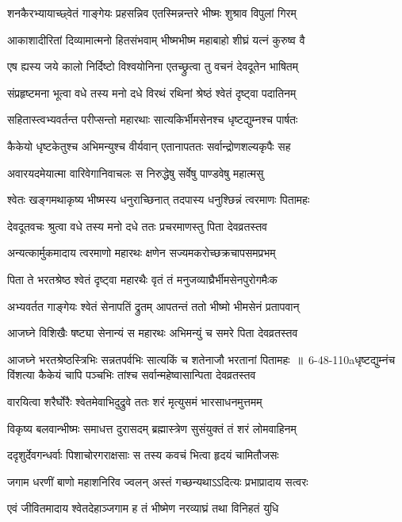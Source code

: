 \twolineshloka
{शनकैरभ्यायाच्छ्वेतं गाङ्गेयः प्रहसन्निव}
{एतस्मिन्नन्तरे भीष्मः शुश्राव विपुलां गिरम्}


\twolineshloka
{आकाशादीरितां दिव्यामात्मनो हितसंभवाम्}
{भीष्मभीष्म महाबाहो शीघ्रं यत्नं कुरुष्व वै}


\twolineshloka
{एष ह्यस्य जये कालो निर्दिष्टो विश्वयोनिना}
{एतच्छ्रुत्वा तु वचनं देवदूतेन भाषितम्}


\twolineshloka
{संप्रहृष्टमना भूत्वा वधे तस्य मनो दधे}
{विरथं रथिनां श्रेष्ठं श्वेतं दृष्ट्वा पदातिनम्}


\twolineshloka
{सहितास्त्वभ्यवर्तन्त परीप्सन्तो महारथाः}
{सात्यकिर्भीमसेनश्च धृष्टद्युम्नश्च पार्षतः}


\twolineshloka
{कैकेयो धृष्टकेतुश्च अभिमन्युश्च वीर्यवान्}
{एतानापततः सर्वान्द्रोणशल्यकृपैः सह}


\twolineshloka
{अवारयदमेयात्मा वारिवेगानिवाचलः}
{स निरुद्धेषु सर्वेषु पाण्डवेषु महात्मसु}


\twolineshloka
{श्वेतः खङ्गमथाकृष्य भीष्मस्य धनुराच्छिनात्}
{तदपास्य धनुश्छिन्नं त्वरमाणः पितामहः}


\twolineshloka
{देवदूतवचः श्रुत्वा वधे तस्य मनो दधे}
{ततः प्रचरमाणस्तु पिता देवव्रतस्तव}


\twolineshloka
{अन्यत्कार्मुकमादाय त्वरमाणो महारथः}
{क्षणेन सज्यमकरोच्छक्रचापसमप्रभम्}


\twolineshloka
{पिता ते भरतश्रेष्ठ श्वेतं दृष्ट्वा महारथैः}
{वृतं तं मनुजव्याघ्रैर्भीमसेनपुरोगमैःक}


\twolineshloka
{अभ्यवर्तत गाङ्गेयः श्वेतं सेनापतिं द्रुतम्}
{आपतन्तं ततो भीष्मो भीमसेनं प्रतापवान्}


\twolineshloka
{आजघ्ने विशिखैः षष्ट्या सेनान्यं स महारथः}
{अभिमन्युं च समरे पिता देवव्रतस्तव}


\threelineshloka
{आजघ्ने भरतश्रेष्ठस्त्रिभिः सन्नतपर्वभिः}
{सात्यकिं च शतेनाजौ भरतानां पितामहः ॥ 6-48-110aधृष्टद्युम्नंच विंशत्या कैकेयं चापि पञ्चभिः}
{तांश्च सर्वान्महेष्वासान्पिता देवव्रतस्तव}


\twolineshloka
{वारयित्वा शरैर्घोरैः श्वेतमेवाभिदुद्रुवे}
{ततः शरं मृत्युसमं भारसाधनमुत्तमम्}


\twolineshloka
{विकृष्य बलवान्भीष्मः समाधत्त दुरासदम्}
{ब्रह्मास्त्रेण सुसंयुक्तं तं शरं लोमवाहिनम्}


\twolineshloka
{ददृशुर्देवगन्धर्वाः पिशाचोरगराक्षसाः}
{स तस्य कवचं भित्वा हृदयं चामितौजसः}


\twolineshloka
{जगाम धरणीं बाणो महाशनिरिव ज्वलन्}
{अस्तं गच्छन्यथाऽऽदित्यः प्रभाप्रादाय सत्वरः}


\twolineshloka
{एवं जीवितमादाय श्वेतदेहाञ्जगाम ह}
{तं भीष्मेण नरव्याघ्रं तथा विनिहतं युधि}


